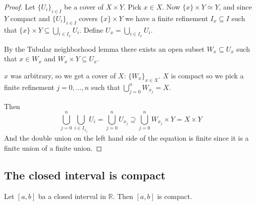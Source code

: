 \begin{proof}
  Let \( \{ U_i \}_{i \in I}  \) be a cover of
  \( X \times Y \).
  Pick \( x \in X \). Now \( \{ x \} \times Y \simeq Y \),
  and since \( Y \) compact and \( \{ U_i \}_{i \in I}  \)
  covers \( \{ x \} \times Y \)
  we have a finite refinement \( I_x \subseteq I \)
  such that \(\{ x \} \times Y \subseteq  \bigcup_{i \in I_x} U_i \).
  Define \( U_x = \bigcup_{i \in I_x} U_i \).

  By the Tubular neighborhood lemma there exists
  an open subset \( W_x \subseteq U_x \) such that
  \( x \in W_x \) and \( W_x \times Y \subseteq U_x \).

  \( x \) was arbitrary, so we get a cover of \( X \):
  \( \{ W_x \}_{x \in X}  \). \( X \) is compact
  so we pick a finite refinement \( j = 0, \dots, n \) such that
  \( \bigcup_{j = 0}^n W_{x_j} = X \).

  Then
  \[
    \bigcup_{j = 0}^n \bigcup_{i \in I_{x_j}} U_i
    = \bigcup_{j = 0}^n U_{x_j}
    \supseteq \bigcup_{j=0}^n W_{x_j} \times Y = X \times Y
  \] 
  And the double union on the left hand side
  of the equation is finite since it is a
  finite union of a finite union.
\end{proof}

\subsection{The closed interval is compact}

\begin{theorem}
  Let \( [a, b] \) ba a closed interval in \( \mathbb{R} \).
  Then \( [a, b] \) is compact.
\end{theorem}

